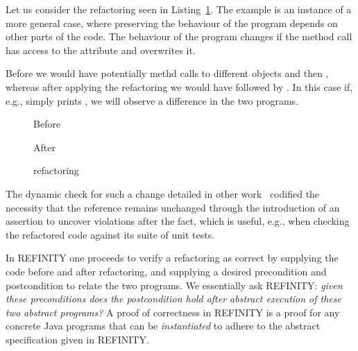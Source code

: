 Let us consider the  refactoring seen in Listing~\ref{lst:ExtractVariable-java}.
The example is an instance of a more general case, where preserving the behaviour of the program depends on other parts of the code.
The behaviour of the program changes if the method call  has access to the attribute  and overwrites it.

Before we would have potentially methd calls to different objects  and then , whereas after applying the refactoring we would
have  followed by .
In this case if, e.g.,  simply prints , we will observe a difference in the two programs.

\begin{figure}[tbp]
  \captionsetup{type=lstlisting}
  \centering
  \begin{sublstlisting}[b]{.2\linewidth}
    
    \caption{Before}
  \end{sublstlisting}\hspace{1.5cm}
  \begin{sublstlisting}[b]{.34\linewidth}
    
    \caption{After}
  \end{sublstlisting}
  \caption{ refactoring}
  \label{lst:ExtractVariable-java}
\end{figure}

The dynamic check for such a change detailed in other work~\cite{stolz:isolarefa} codified the necessity that the reference 
remains unchanged through the introduction of an assertion  to uncover violations after the fact,
which is useful, e.g., when checking the refactored code against its suite of unit tests.

In REFINITY one proceeds to verify a refactoring as correct by supplying the code before and after refactoring, and supplying a desired precondition and postcondition to relate the two programs.
We essentially ask REFINITY: \emph{given these preconditions does the postcondition hold after abstract execution of these two abstract programs?}
A proof of correctness in REFINITY is a proof for any concrete Java programs that can be \emph{instantiated} to adhere to the abstract specification given in REFINITY.

